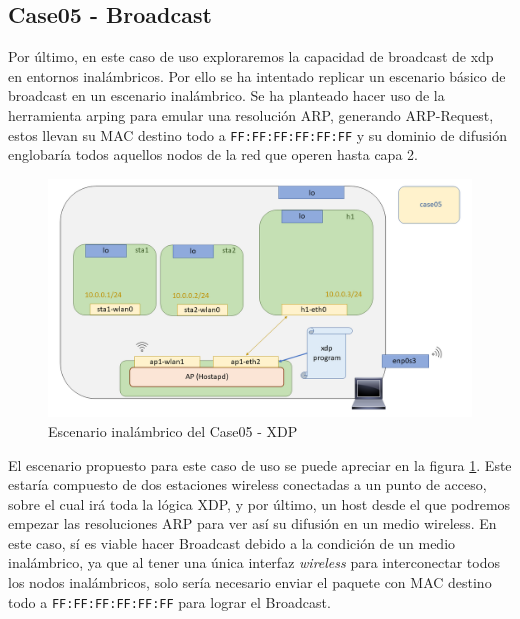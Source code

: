 \subsection{Case05 - Broadcast}
\label{xdp_wifi_case05}
\vspace{0.3cm}
Por último, en este caso de uso exploraremos la capacidad de broadcast de \gls{xdp} en entornos inalámbricos. Por ello se ha intentado replicar un escenario básico de broadcast en un escenario inalámbrico. Se ha planteado hacer uso de la herramienta arping para emular una resolución ARP, generando ARP-Request, estos llevan su MAC destino todo a \texttt{FF:FF:FF:FF:FF:FF} y su dominio de difusión englobaría todos aquellos nodos de la red que operen hasta capa 2.\\
\par

\begin{figure}[ht]
    \centering
    \includegraphics[width=16cm]{archivos/img/dev/xdp-wifi/case05/scenario.png}
    \caption{Escenario inalámbrico del Case05 - XDP}
    \label{fig:case05_xdp_wifi_scenario}
\end{figure}


El escenario propuesto para este caso de uso se puede apreciar en la figura \ref{fig:case05_xdp_wifi_scenario}. Este estaría compuesto de dos estaciones wireless conectadas a un punto de acceso, sobre el cual irá toda la lógica XDP, y por último, un host desde el que podremos empezar las resoluciones ARP para ver así su difusión en un medio wireless. En este caso, sí es viable hacer Broadcast debido a la condición de un medio inalámbrico, ya que al tener una única interfaz \textit{wireless} para interconectar todos los nodos inalámbricos, solo sería necesario enviar el paquete con MAC destino todo a \texttt{FF:FF:FF:FF:FF:FF} para lograr el Broadcast. 


